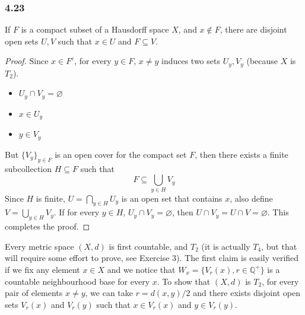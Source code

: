 \documentclass[../../main.tex]{subfiles}
\begin{document}
\subsubsection*{4.23}
\begin{wts}
If $F$ is a compact subset of a Hausdorff space $X$, and $x\notin F$, there are disjoint open sets $U, V$ such that $x\in U$ and $F\subseteq V$.
\end{wts}
\begin{proof}
Since $x\in F^c$, for every $y\in F$, $x\neq y$ induces two sets $U_y, V_y$ (because $X$ is $T_2$).
\begin{itemize}
    \item $U_y\cap V_y=\varnothing$
    \item $x\in U_y$
    \item $y\in V_y$
\end{itemize}
But $\{V_y\}_{y\in F}$ is an open cover for the compact set $F$, then there exists a finite subcollection $H\subseteq F$ such that 
\[
F\subseteq \bigcup_{y\in H}V_y
\]
Since $H$ is finite, $U=\bigcap_{y\in H}U_y$ is an open set that contains $x$, also define $V = \bigcup_{y\in H}V_y$. If for every $y\in H$, $U_y\cap V_y=\varnothing$, then $U\cap V_y=U\cap V=\varnothing$. This completes the proof.
\end{proof}
\remark Every metric space $(X,d)$ is first countable, and $T_2$ (it is actually $T_4$, but that will require some effort to prove, see Exercise 3). The first claim is easily verified if we fix any element $x\in X$ and we notice that $W_x=\{V_{r}(x), r\in \mathbb{Q}^+\}$ is a countable neighbourhood base for every $x$. To show that $(X,d)$ is $T_2$, for every pair of elements $x\neq y$, we can take $r=d(x,y)/2$ and there exists disjoint open sets $V_r(x)$ and $V_r(y)$ such that $x\in V_r(x)$ and $y\in V_r(y)$.
\end{document}
